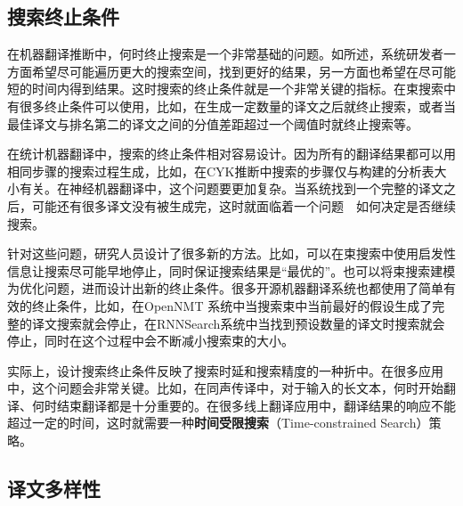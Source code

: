 \subsection{搜索终止条件}

\parinterval 在机器翻译推断中，何时终止搜索是一个非常基础的问题。如{\chaptertwo}所述，系统研发者一方面希望尽可能遍历更大的搜索空间，找到更好的结果，另一方面也希望在尽可能短的时间内得到结果。这时搜索的终止条件就是一个非常关键的指标。在束搜索中有很多终止条件可以使用，比如，在生成一定数量的译文之后就终止搜索，或者当最佳译文与排名第二的译文之间的分值差距超过一个阈值时就终止搜索等。

\parinterval 在统计机器翻译中，搜索的终止条件相对容易设计。因为所有的翻译结果都可以用相同步骤的搜索过程生成，比如，在CYK推断中搜索的步骤仅与构建的分析表大小有关。在神经机器翻译中，这个问题要更加复杂。当系统找到一个完整的译文之后，可能还有很多译文没有被生成完，这时就面临着一个问题\ \dash \ 如何决定是否继续搜索。

\parinterval 针对这些问题，研究人员设计了很多新的方法。比如，可以在束搜索中使用启发性信息让搜索尽可能早地停止，同时保证搜索结果是“最优的”。也可以将束搜索建模为优化问题，进而设计出新的终止条件。很多开源机器翻译系统也都使用了简单有效的终止条件，比如，在OpenNMT 系统中当搜索束中当前最好的假设生成了完整的译文搜索就会停止，在RNNSearch系统中当找到预设数量的译文时搜索就会停止，同时在这个过程中会不断减小搜索束的大小。

\parinterval 实际上，设计搜索终止条件反映了搜索时延和搜索精度的一种折中。在很多应用中，这个问题会非常关键。比如，在同声传译中，对于输入的长文本，何时开始翻译、何时结束翻译都是十分重要的。在很多线上翻译应用中，翻译结果的响应不能超过一定的时间，这时就需要一种{\small\sffamily\bfseries{时间受限搜索}}（Time-constrained Search）策略。


\subsection{译文多样性}

